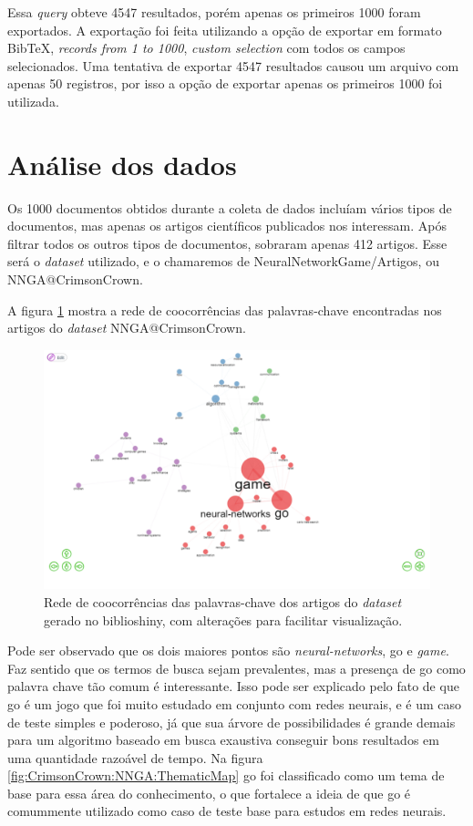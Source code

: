 Essa \textit{query} obteve 4547 resultados, porém apenas os primeiros 1000 foram exportados. A exportação foi feita utilizando a opção de exportar em formato BibTeX, \textit{records from 1 to 1000}, \textit{custom selection} com todos os campos selecionados. Uma tentativa de exportar 4547 resultados causou um arquivo com apenas 50 registros, por isso a opção de exportar apenas os primeiros 1000 foi utilizada.

\section{Análise dos dados}
Os 1000 documentos obtidos durante a coleta de dados incluíam vários tipos de documentos, mas apenas os artigos científicos publicados nos interessam. Após filtrar todos os outros tipos de documentos, sobraram apenas 412 artigos. Esse será o \textit{dataset} utilizado, e o chamaremos de NeuralNetworkGame/Artigos, ou NNGA@CrimsonCrown.

A figura \ref{fig:CrimsonCrown:NNGA:CoOcurrence} mostra a rede de coocorrências das palavras-chave encontradas nos artigos do \textit{dataset} NNGA@CrimsonCrown.

\begin{figure}
    \centering
    \includegraphics[angle=0,width=1\textwidth,height=0.5\textheight]{experiments/CrimsonCrown/AnaliseBibliometrica/RedesNeuraisJogos/NNGAConceptNetwork.png}
    \caption{Rede de coocorrências das palavras-chave dos artigos do \textit{dataset} gerado no biblioshiny, com alterações para facilitar visualização.}
    \label{fig:CrimsonCrown:NNGA:CoOcurrence}
\end{figure}

Pode ser observado que os dois maiores pontos são \textit{neural-networks}, go e \textit{game}. Faz sentido que os termos de busca sejam prevalentes, mas a presença de go como palavra chave tão comum é interessante. Isso pode ser explicado pelo fato de que go é um jogo que foi muito estudado em conjunto com redes neurais, e é um caso de teste simples e poderoso, já que sua árvore de possibilidades é grande demais para um algoritmo baseado em busca exaustiva conseguir bons resultados em uma quantidade razoável de tempo. Na figura \ref{fig:CrimsonCrown:NNGA:ThematicMap} go foi classificado como um tema de base para essa área do conhecimento, o que fortalece a ideia de que go é comummente utilizado como caso de teste base para estudos em redes neurais.

